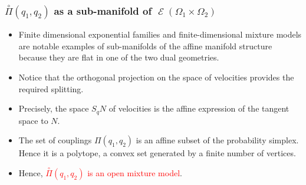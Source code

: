 \documentclass[xcolor=svgnames]{beamer}
\DeclareMathOperator{\Maxexp}{\mathcal E}
\newcommand{\maxexpat}[1]{\Maxexp\left(#1\right)}
\newcommand{\openplan}[2]{\overset{\circ}\Pi\left(#1,#2\right)}
\newcommand{\rosso}[1]{\textcolor{red}{#1}}
\renewcommand{\emph}{\rosso}
\begin{document}
  \begin{frame}[plain]\small\frametitle{$\openplan {q_1} {q_2}$ as a sub-manifold of $\maxexpat{\Omega_1 \times \Omega_2}$}
      
  \begin{itemize}

\item Finite dimensional exponential families and finite-dimensional mixture models are notable examples of sub-manifolds of the affine manifold structure because they are flat in one of the two dual geometries. 

\item Notice that the orthogonal projection on the space of velocities provides the required splitting.

\item Precisely, the space $S_q N$ of velocities is the affine expression of the tangent space to $N$. 

\item The set of couplings $\Pi(q_1,q_2)$ is an affine subset of the probability simplex. Hence it is a polytope, a convex set generated by a finite number of vertices. 

\item Hence, \emph{$\openplan {q_1}{q_2}$ is an open mixture model}. 

\end{itemize}
\end{frame}
\end{document}
